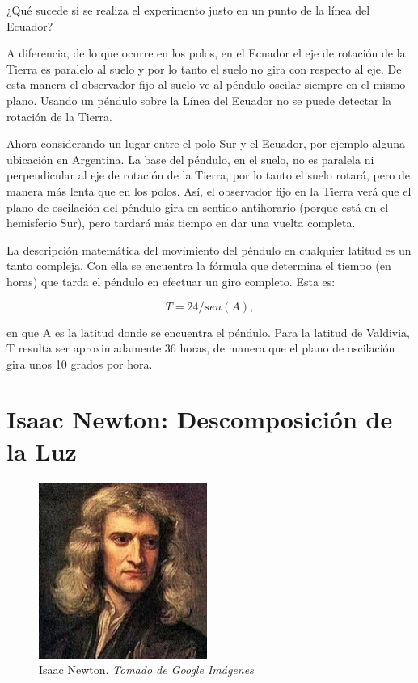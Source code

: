 \documentclass[journal]{IEEEtran}
\begin{document}
¿Qué sucede si se realiza el experimento justo en un punto de la línea del Ecuador?

A diferencia, de lo que ocurre en los polos, en el Ecuador el eje de rotación de la Tierra es paralelo al suelo y por lo tanto el suelo no gira con respecto al eje. De esta manera el observador fijo al suelo ve al péndulo oscilar siempre en el mismo plano. Usando un péndulo sobre la Línea del Ecuador no se puede detectar la rotación de la Tierra.

Ahora considerando un lugar entre el polo Sur y el Ecuador, por ejemplo alguna ubicación en Argentina. La base del péndulo, en el suelo, no es paralela ni perpendicular al eje de rotación de la Tierra, por lo tanto el suelo rotará, pero de manera más lenta que en los polos. Así, el observador fijo en la Tierra verá que el plano de oscilación del péndulo gira en sentido antihorario (porque está en el hemisferio Sur), pero tardará más tiempo en dar una vuelta completa.

La descripción matemática del movimiento del péndulo en cualquier latitud es un tanto compleja. Con ella se encuentra la fórmula que determina el tiempo (en horas) que tarda el péndulo en efectuar un giro completo. Esta es:

\begin{equation}
    T=24/sen(A),
\end{equation}

en que A es la latitud donde se encuentra el péndulo. Para la latitud de Valdivia, T resulta ser aproximadamente 36 horas, de manera que el plano de oscilación gira unos 10 grados por hora.








\hfill \break
\section{Isaac Newton: Descomposición de la Luz}

\begin{center}
  \begin{figure}[h!]
  \includegraphics[width=55mm]{newton.jpg}
  \caption{Isaac Newton. \emph{Tomado de Google Imágenes}}
  \end{figure}
\end{center}
\end{document}

